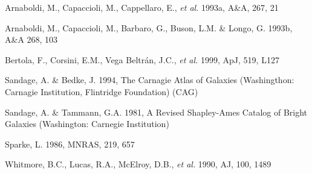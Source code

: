 \begin{references} 

 Arnaboldi, M., Capaccioli, M., Cappellaro, E., 
   {\it et al.\/} 1993a, A\&A, 267, 21 

 Arnaboldi, M., Capaccioli, M., Barbaro, G., 
   Buson, L.M. \& Longo, G. 
   1993b, A\&A 268, 103 

 Bertola, F., Corsini, E.M., Vega Beltr\'an, J.C., 
   {\it et al.\/} 1999, ApJ, 519, L127 

 Sandage, A. \& Bedke, J. 1994,
    The Carnagie Atlas of Galaxies (Washingthon: 
    Carnagie Institution, Flintridge Foundation) (CAG)
    
 Sandage, A. \& Tammann, G.A. 1981,
    A Revised Shapley-Ames Catalog of Bright Galaxies 
    (Washington: Carnegie Institution)

 Sparke, L. 1986, MNRAS, 219, 657

 Whitmore, B.C., Lucas, R.A., McElroy, D.B., 
   {\it et al.\/} 1990, AJ, 100, 1489 



\end{references}



